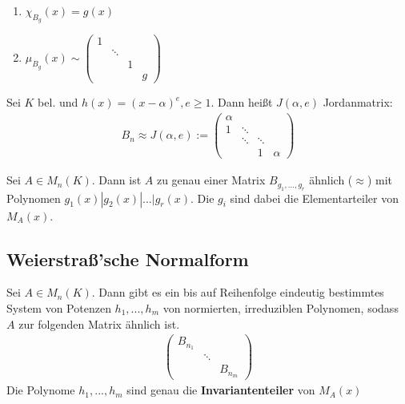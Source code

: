 \begin{remark}
\leavevmode
\begin{enumerate}
	\item $\chi_{B_g}(x) = g(x)$
	\item $\mu_{B_g}(x) \sim 
	\begin{pmatrix}
		1 &        & & \\
		  & \ddots & & \\
		  &        &1& \\
		  &        & & g
	\end{pmatrix}$
\end{enumerate}
\end{remark}


\begin{definition}
Sei $K$ bel. und $h(x)=(x-\alpha)^e, e \geq 1$. Dann heißt $J(\alpha,e)$ Jordanmatrix:
\begin{align*}
B_n \approx J(\alpha,e) :=
\begin{pmatrix}
\alpha &        &   &\\
1      & \ddots &   &\\
       & \ddots & \ddots &\\
       &        & 1 & \alpha
\end{pmatrix}
\end{align*}
\end{definition}

\begin{theorem}
Sei $A \in M_n(K)$. Dann ist $A$ zu genau einer Matrix $B_{g_1,...,g_r}$ ähnlich ($\approx$) mit Polynomen $g_1(x) | g_2(x)| ... | g_r(x)$. Die $g_i$ sind dabei die Elementarteiler von $M_A(x)$.
\end{theorem}
\subsection{Weierstraß'sche Normalform}
\begin{theorem}
Sei $A \in M_n(K)$. Dann gibt es ein bis auf Reihenfolge eindeutig bestimmtes System von Potenzen $h_1,...,h_m$ von normierten, irreduziblen Polynomen, sodass $A$ zur folgenden Matrix ähnlich ist.
\begin{align*}
\begin{pmatrix}
B_{n_1} &        & \\
        & \ddots & \\
        &		  & B_{n_m}
\end{pmatrix}
\end{align*}
Die Polynome $h_1,...,h_m$ sind genau die \textbf{Invariantenteiler} von $M_A(x)$
\end{theorem}

